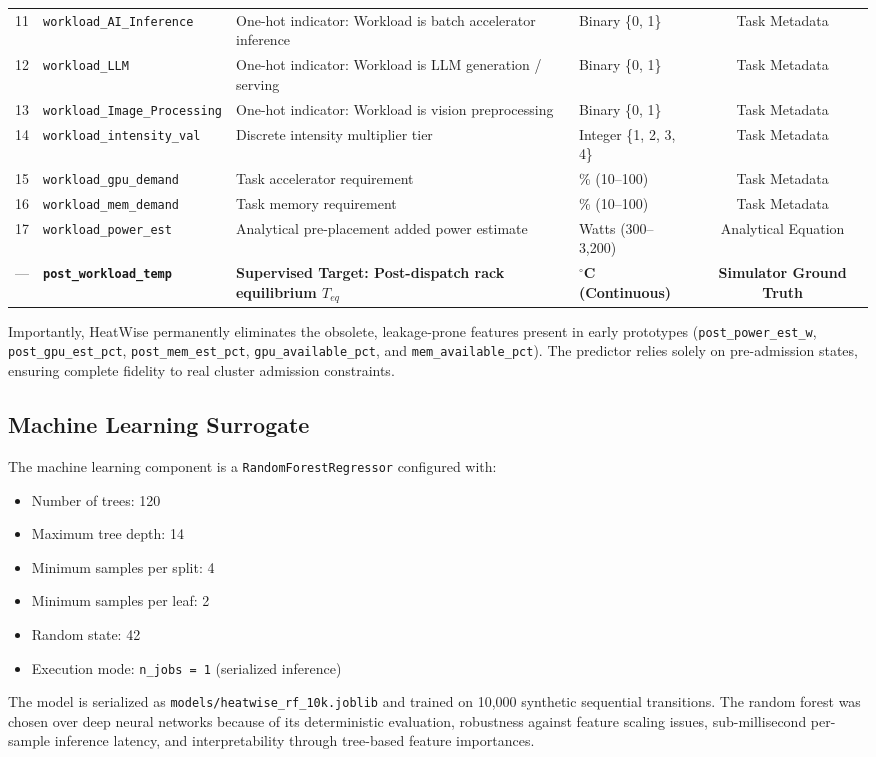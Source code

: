 \documentclass[conference,10pt]{IEEEtran}
\begin{document}
\begin{table}[t]
{\begin{tabular}{clllc}
11 & \texttt{workload\_AI\_Inference} & One-hot indicator: Workload is batch accelerator inference & Binary \{0, 1\} & Task Metadata \\
12 & \texttt{workload\_LLM} & One-hot indicator: Workload is LLM generation / serving & Binary \{0, 1\} & Task Metadata \\
13 & \texttt{workload\_Image\_Processing} & One-hot indicator: Workload is vision preprocessing & Binary \{0, 1\} & Task Metadata \\
14 & \texttt{workload\_intensity\_val} & Discrete intensity multiplier tier & Integer \{1, 2, 3, 4\} & Task Metadata \\
15 & \texttt{workload\_gpu\_demand} & Task accelerator requirement & \% (10--100) & Task Metadata \\
16 & \texttt{workload\_mem\_demand} & Task memory requirement & \% (10--100) & Task Metadata \\
17 & \texttt{workload\_power\_est} & Analytical pre-placement added power estimate & Watts (300--3,200) & Analytical Equation \\
\midrule
--- & \textbf{\texttt{post\_workload\_temp}} & \textbf{Supervised Target: Post-dispatch rack equilibrium $T_{eq}$} & \textbf{$^\circ$C (Continuous)} & \textbf{Simulator Ground Truth} \\
\bottomrule
\end{tabular}%
}
\end{table}

Importantly, HeatWise permanently eliminates the obsolete, leakage-prone features present in early prototypes (\texttt{post\_power\_est\_w}, \texttt{post\_gpu\_est\_pct}, \texttt{post\_mem\_est\_pct}, \texttt{gpu\_available\_pct}, and \texttt{mem\_available\_pct}). The predictor relies solely on pre-admission states, ensuring complete fidelity to real cluster admission constraints.

\subsection{Machine Learning Surrogate}
The machine learning component is a \texttt{RandomForestRegressor} \cite{breiman2001random, pedregosa2011scikit} configured with:
\begin{itemize}
    \item Number of trees: 120
    \item Maximum tree depth: 14
    \item Minimum samples per split: 4
    \item Minimum samples per leaf: 2
    \item Random state: 42
    \item Execution mode: \texttt{n\_jobs = 1} (serialized inference)
\end{itemize}
The model is serialized as \texttt{models/heatwise\_rf\_10k.joblib} and trained on 10,000 synthetic sequential transitions. The random forest was chosen over deep neural networks because of its deterministic evaluation, robustness against feature scaling issues, sub-millisecond per-sample inference latency, and interpretability through tree-based feature importances.
\end{document}
